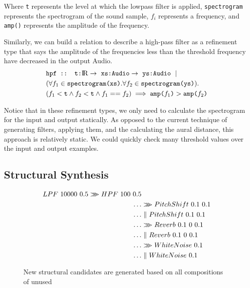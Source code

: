 Where \texttt{t} represents the level at which the lowpass filter is applied, \texttt{spectrogram} represents the spectrogram of the sound sample, $f_i$ represents a frequency, and \texttt{amp()} represents the amplitude of the frequency. 

Similarly, we can build a relation to describe a high-pass filter as a refinement type that says the amplitude of the frequencies less than the threshold frequency have decreased in the output Audio.
%
\begin{align*}
  &\texttt{hpf :: t:\reals} \to\ \texttt{xs:Audio} \to\ \texttt{ys:Audio}\ \mid \\
  &(\forall f_1 \in \texttt{spectrogram(xs)}. \forall f_2 \in \texttt{spectrogram(ys)}). \\
  &(f_1 < \texttt{t} \land f_2 < \texttt{t} \land f_1 == f_2) \implies \texttt{amp(}f_1\texttt{)} > \texttt{amp(} f_2 \texttt{)} 
\end{align*}

Notice that in these refinement types, we only need to calculate the spectrogram for the input and output statically.
As opposed to the current technique of generating filters, applying them, and the calculating the aural distance, this approach is relatively static.
We could quickly check many threshold values over the input and output examples.

\subsection{Structural Synthesis}

\begin{figure}
\begin{align*}
	LPF \ 10000 \ 0.5 \arrComp HPF \ 100 \ 0.5 & \\
	\ldots & \arrComp PitchShift \ 0.1 \ 0.1 \\
	\ldots & \parallelCompose PitchShift \ 0.1 \ 0.1 \\
	\ldots & \arrComp Reverb \ 0.1 \ 0 \ 0.1 \\
	\ldots & \parallelCompose Reverb \ 0.1 \ 0 \ 0.1 \\
	\ldots & \arrComp WhiteNoise \ 0.1 \\
	\ldots & \parallelCompose WhiteNoise \ 0.1
\end{align*}
\caption{New structural candidates are generated based on all compositions of unused \dspnode}
\label{fig:generation}
\end{figure}

